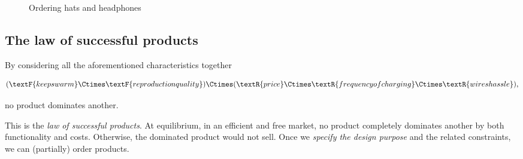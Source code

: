\begin{figure*}[h]
    \caption{Ordering hats and headphones}
\end{figure*}



\subsection{The law of successful products}
By considering all the aforementioned characteristics together
\begin{widepar}
    \begin{equation}
        (\textF{keeps warm}\Ctimes \textF{reproduction quality})
        \Ctimes (\textR{price}\Ctimes \textR{frequency of charging}\Ctimes \textR{wires hassle}),
    \end{equation}
\end{widepar}
no product dominates another.

This is the \emph{law of successful products}.
At equilibrium, in an efficient and free market, no product completely dominates another by both functionality and costs.
Otherwise, the dominated product would not sell.
Once we \emph{specify the design purpose} and the related constraints, we can (partially) order products.

